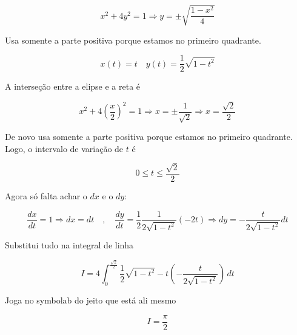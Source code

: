 \[ x^2 + 4y^2 = 1 \Longrightarrow y = \pm \sqrt{\frac{1 - x^2}{4}} \]

Usa somente a parte positiva porque estamos no primeiro quadrante. 

\[ x(t) = t \quad y(t) = \frac{1}{2}\sqrt{1 - t^2}  \]

A interseção entre a elipse e a reta é 

\[ x^2 + 4\left(\frac{x}{2}\right)^2 = 1 \Longrightarrow x = \pm \frac{1}{\sqrt{2}} \Longrightarrow x = \frac{\sqrt{2}}{2} \]

De novo usa somente a parte positiva porque estamos no primeiro quadrante. Logo, o intervalo de variação de $t$ é  

\[ 0 \leq t \leq \frac{\sqrt{2}}{2} \]

Agora só falta achar o $dx$ e o $dy$:

\[ \frac{dx}{dt} = 1 \Longrightarrow dx = dt \quad , \quad \frac{dy}{dt} = \frac{1}{2}\frac{1}{2\sqrt{1 - t^2}}(-2t) \Longrightarrow dy = -\frac{t}{2\sqrt{1 - t^2}}dt \]

Substitui tudo na integral de linha  

\[ I = 4 \int_0^{\frac{\sqrt{2}}{2}} \frac{1}{2}\sqrt{1 - t^2} - t \left(-\frac{t}{2\sqrt{1 - t^2}}\right) \, dt \]

Joga no symbolab do jeito que está ali mesmo

\[ \boxed{I = \frac{\pi}{2}} \]

















